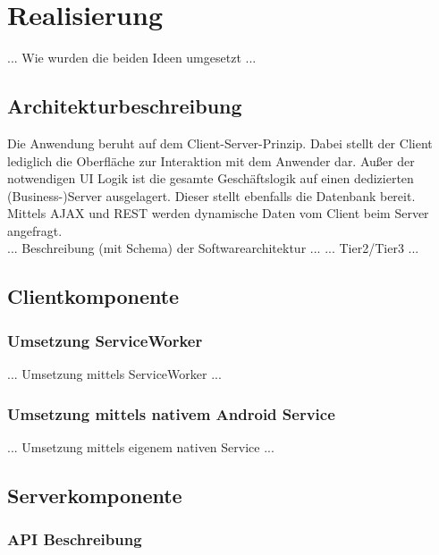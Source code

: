 \section{Realisierung}

... Wie wurden die beiden Ideen umgesetzt ...

\subsection{Architekturbeschreibung}

Die Anwendung beruht auf dem Client-Server-Prinzip. Dabei stellt der Client lediglich die Oberfläche zur Interaktion mit dem Anwender dar. Außer der notwendigen UI Logik ist die gesamte Geschäftslogik auf einen dedizierten (Business-)Server ausgelagert. Dieser stellt ebenfalls die Datenbank bereit. Mittels AJAX und REST werden dynamische Daten vom Client beim Server angefragt.\\

... Beschreibung (mit Schema) der Softwarearchitektur ...
... Tier2/Tier3 ...

\subsection{Clientkomponente}
\subsubsection{Umsetzung ServiceWorker}

... Umsetzung mittels ServiceWorker ...

\subsubsection{Umsetzung mittels nativem Android Service}

... Umsetzung mittels eigenem nativen Service ...


\subsection{Serverkomponente}
\subsubsection{API Beschreibung}


